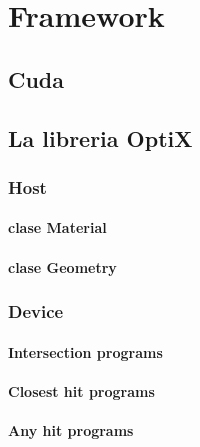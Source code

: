 \chapter{Framework}

\section{Cuda}

\section{La libreria OptiX}

\subsection{Host}

\subsubsection{clase Material}

\subsubsection{clase Geometry}

\subsection{Device}

\subsubsection{Intersection programs}

\subsubsection{Closest hit programs}

\subsubsection{Any hit programs}

